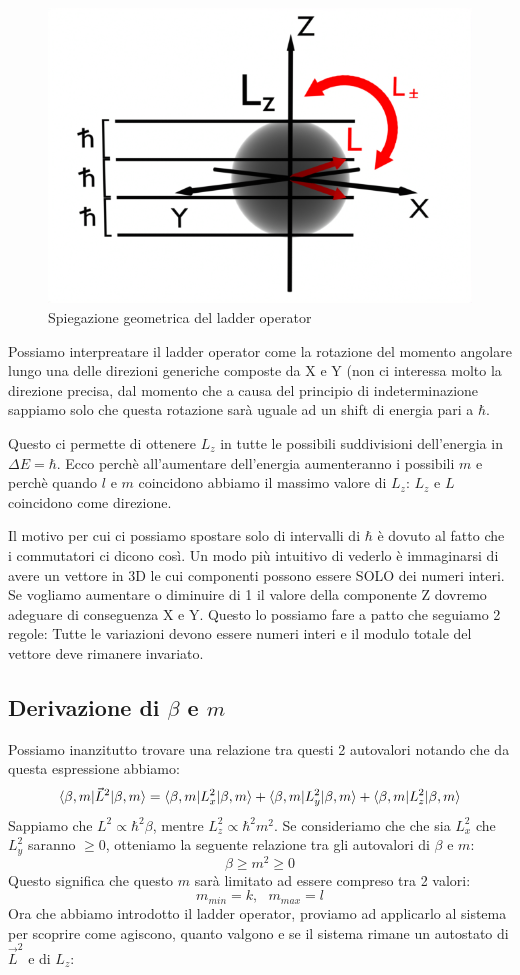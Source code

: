 \begin{figure}[ht]
	\centering
	\includegraphics[width=.5\textwidth]{../images/ladder.png} 
	\caption{Spiegazione geometrica del ladder operator}
	\label{fig:ladder}
\end{figure}

\noindent Possiamo interpreatare il ladder operator come la rotazione del momento angolare lungo una delle direzioni generiche composte da X e Y (non ci interessa molto la direzione precisa, dal momento che a causa del principio di indeterminazione sappiamo solo che questa rotazione sarà uguale ad un shift di energia pari a $\hbar$.

Questo ci permette di ottenere $L_z$ in tutte le possibili suddivisioni dell'energia in $\Delta E = \hbar$. Ecco perchè all'aumentare dell'energia aumenteranno i possibili $m$ e perchè quando $l$ e $m$ coincidono abbiamo il massimo valore di $L_z$: $L_z$ e $L$ coincidono come direzione.

Il motivo per cui ci possiamo spostare solo di intervalli di $\hbar$ è dovuto al fatto che i commutatori ci dicono così. Un modo più intuitivo di vederlo è immaginarsi di avere un vettore in 3D le cui componenti possono essere SOLO dei numeri interi. Se vogliamo aumentare o diminuire di 1 il valore della componente Z dovremo adeguare di conseguenza X e Y. Questo lo possiamo fare a patto che seguiamo 2 regole: Tutte le variazioni devono essere numeri interi e il modulo totale del vettore deve rimanere invariato.

\subsection{Derivazione di $\beta$ e $m$}
Possiamo inanzitutto trovare una relazione tra questi 2 autovalori notando che da questa espressione abbiamo:
$$\braket{\beta, m | \vec{L}^2 | \beta, m} = \braket{\beta, m | L_x^2 | \beta, m} + \braket{\beta, m | L_y^2 | \beta, m} + \braket{\beta, m | L_z^2 | \beta, m} $$
Sappiamo che $L^2 \propto \hbar^2 \beta$, mentre $L_z^2 \propto \hbar^2 m^2$. Se consideriamo che che sia $L^2_x$ che $L^2_y$ saranno $\geq 0$, otteniamo la seguente relazione tra gli autovalori di {$\beta$} e {$m$}:
$$\beta \geq m^2 \geq 0$$
Questo significa che questo $m$ sarà limitato ad essere compreso tra 2 valori:
$$m_{min} = k, \text{ } m_{max} = l$$
Ora che abbiamo introdotto il ladder operator, proviamo ad applicarlo al sistema per scoprire come agiscono, quanto valgono e se il sistema rimane un autostato di $\vec{L}^2$ e di $L_z$:

